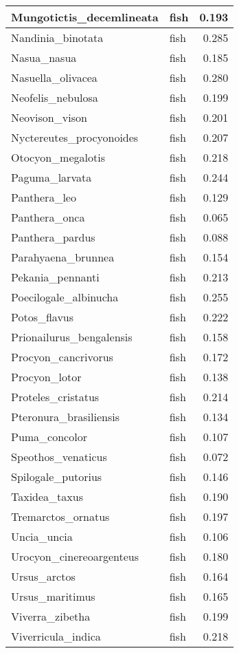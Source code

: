 \begin{table}
\begin{tabular}[t]{l|l|r}
\hline
Mungotictis\_decemlineata & fish & 0.193\\
\hline
Nandinia\_binotata & fish & 0.285\\
\hline
Nasua\_nasua & fish & 0.185\\
\hline
Nasuella\_olivacea & fish & 0.280\\
\hline
Neofelis\_nebulosa & fish & 0.199\\
\hline
Neovison\_vison & fish & 0.201\\
\hline
Nyctereutes\_procyonoides & fish & 0.207\\
\hline
Otocyon\_megalotis & fish & 0.218\\
\hline
Paguma\_larvata & fish & 0.244\\
\hline
Panthera\_leo & fish & 0.129\\
\hline
Panthera\_onca & fish & 0.065\\
\hline
Panthera\_pardus & fish & 0.088\\
\hline
Parahyaena\_brunnea & fish & 0.154\\
\hline
Pekania\_pennanti & fish & 0.213\\
\hline
Poecilogale\_albinucha & fish & 0.255\\
\hline
Potos\_flavus & fish & 0.222\\
\hline
Prionailurus\_bengalensis & fish & 0.158\\
\hline
Procyon\_cancrivorus & fish & 0.172\\
\hline
Procyon\_lotor & fish & 0.138\\
\hline
Proteles\_cristatus & fish & 0.214\\
\hline
Pteronura\_brasiliensis & fish & 0.134\\
\hline
Puma\_concolor & fish & 0.107\\
\hline
Speothos\_venaticus & fish & 0.072\\
\hline
Spilogale\_putorius & fish & 0.146\\
\hline
Taxidea\_taxus & fish & 0.190\\
\hline
Tremarctos\_ornatus & fish & 0.197\\
\hline
Uncia\_uncia & fish & 0.106\\
\hline
Urocyon\_cinereoargenteus & fish & 0.180\\
\hline
Ursus\_arctos & fish & 0.164\\
\hline
Ursus\_maritimus & fish & 0.165\\
\hline
Viverra\_zibetha & fish & 0.199\\
\hline
Viverricula\_indica & fish & 0.218\\

\end{tabular}
\end{table}
